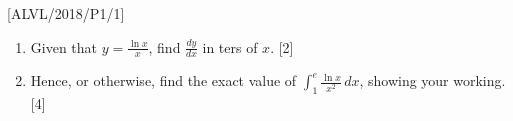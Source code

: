 \item {[}ALVL/2018/P1/1{]}
\begin{enumerate}
\item Given that $y=\frac{\ln x}{x}$, find $\frac{dy}{dx}$ in ters of
$x$. \hfill{}{[}2{]}
\item Hence, or otherwise, find the exact value of $\int_{1}^{e}\frac{\ln x}{x^{2}}\,dx$,
showing your working. \hfill{}{[}4{]}
\end{enumerate}
